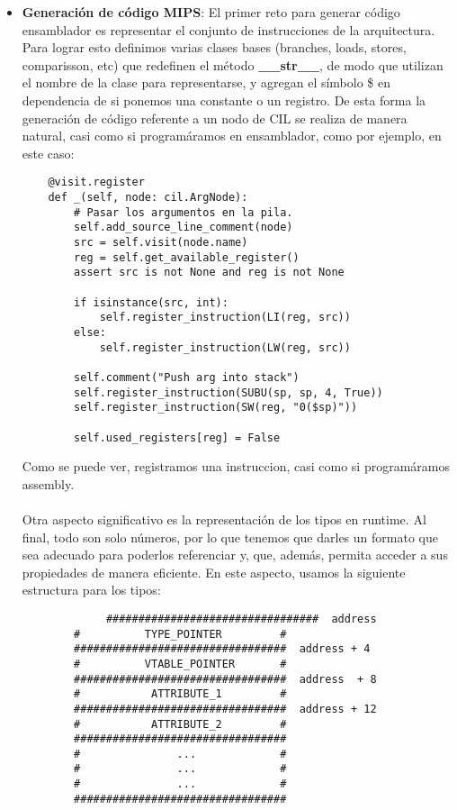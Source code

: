 \documentclass[a4paper, 12pt]{article}
\begin{document}
\begin{itemize}
\item \textbf{Generaci\'on de c\'odigo MIPS}: El primer reto para generar c\'odigo ensamblador es representar el
conjunto de instrucciones de la arquitectura. Para lograr esto definimos varias clases bases (branches, loads, stores, comparisson, etc)
que redefinen el m\'etodo \textbf{\_\_str\_\_}, de modo que utilizan el nombre de la clase para representarse, y agregan el s\'imbolo
\$ en dependencia de si ponemos una constante o un registro. De esta forma la generaci\'on de c\'odigo referente a un nodo de CIL
se realiza de manera natural, casi como si program\'aramos en ensamblador, como por ejemplo, en este caso:

\begin{verbatim}
	@visit.register
    def _(self, node: cil.ArgNode):
        # Pasar los argumentos en la pila.
        self.add_source_line_comment(node)
        src = self.visit(node.name)
        reg = self.get_available_register()
        assert src is not None and reg is not None

        if isinstance(src, int):
            self.register_instruction(LI(reg, src))
        else:
            self.register_instruction(LW(reg, src))

        self.comment("Push arg into stack")
        self.register_instruction(SUBU(sp, sp, 4, True))
        self.register_instruction(SW(reg, "0($sp)"))

        self.used_registers[reg] = False
\end{verbatim}

Como se puede ver, registramos una instruccion, casi como si program\'aramos assembly.

\paragraph{}
Otra aspecto significativo es la representaci\'on de los tipos en runtime. Al final, todo son solo n\'umeros,
por lo que tenemos que darles un formato que sea adecuado para poderlos referenciar y, que, adem\'as, permita
acceder a sus propiedades de manera eficiente. En este aspecto, usamos la siguiente estructura para los tipos:

\begin{verbatim}
		     #################################  address
    	#          TYPE_POINTER         #
    	#################################  address + 4
    	#          VTABLE_POINTER       #
    	#################################  address  + 8
    	#           ATTRIBUTE_1         #
    	#################################  address + 12
    	#           ATTRIBUTE_2         #
    	#################################
    	#               ...             #
    	#               ...             #
    	#               ...             #
    	#################################
\end{verbatim}


\end{itemize}
\end{document}
